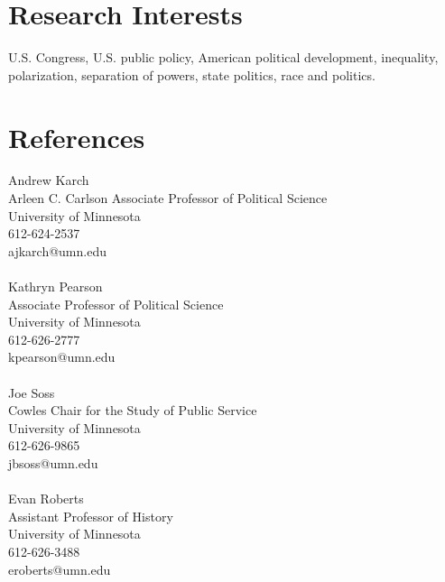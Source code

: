 \documentclass[12pt, letter]{article}
\begin{document}
\section*{Research Interests}
U.S. Congress, U.S. public policy, American political development, inequality, polarization, separation of powers, state politics, race and politics.

\section*{References}
\begin{multicols}{2}
	Andrew Karch \\
	Arleen C. Carlson Associate Professor of Political Science \\
	University of Minnesota \\
	612-624-2537 \\
	ajkarch@umn.edu \\
	\\
	Kathryn Pearson \\
	Associate Professor of Political Science \\
	University of Minnesota \\
	612-626-2777 \\
	kpearson@umn.edu\\
	\\
	Joe Soss \\
	Cowles Chair for the Study of Public Service \\
	University of Minnesota \\
	612-626-9865 \\
	jbsoss@umn.edu \\
	\\
	Evan Roberts \\
	Assistant Professor of History \\
	University of Minnesota \\
	612-626-3488 \\
	eroberts@umn.edu
\end{multicols}

\end{document}
